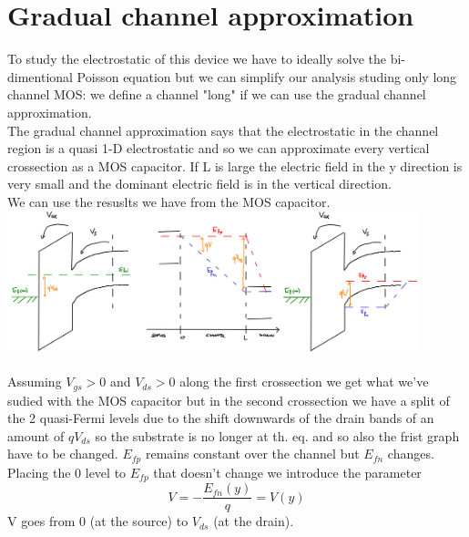 \section{Gradual channel approximation}
To study the electrostatic of this device we have to ideally solve the bi-dimentional Poisson equation but we can simplify our analysis studing only long channel MOS: we define a channel "long" if we can use the gradual channel approximation.\\
The gradual channel approximation says that the electrostatic in the channel region is a quasi 1-D electrostatic and so we can approximate every vertical crossection as a MOS capacitor. If L is large the electric field in the y direction is very small and the dominant electric field is in the vertical direction.\\
We can use the resuslts we have from the MOS capacitor.\\

\centering
\includegraphics[width=0.9\textwidth]{mos2.png}\\
\raggedright

Assuming $V_{gs}>0$ and $V_{ds}>0$ along the first crossection we get what we've sudied with the MOS capacitor but in the second crossection we have a split of the 2 quasi-Fermi levels due to the shift downwards of the drain bands of an amount of $qV_{ds}$ so the substrate is no longer at th. eq. and so also the frist graph have to be changed. $E_{fp}$ remains constant over the channel but $E_{fn}$ changes.\\
Placing the 0 level to $E_{fp}$ that doesn't change we introduce the parameter 
\begin{equation}
V=-\frac{E_{fn}(y)}{q}=V(y)
\end{equation}
V goes from 0 (at the source) to $V_{ds}$ (at the drain).\\


